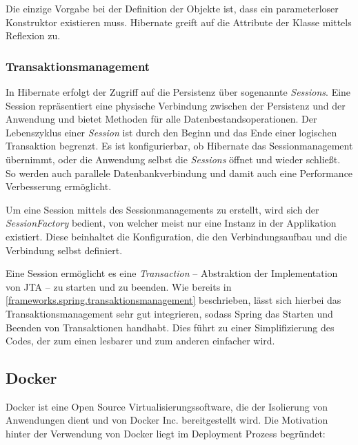 				Die einzige Vorgabe bei der Definition der Objekte ist, dass ein parameterloser Konstruktor existieren muss. Hibernate greift auf die Attribute der Klasse mittels Reflexion zu. 
				
			\subsubsection{Transaktionsmanagement} %
			
				In Hibernate erfolgt der Zugriff auf die Persistenz über sogenannte \textit{Sessions}. Eine Session repräsentiert eine physische Verbindung zwischen der Persistenz und der Anwendung und bietet Methoden für alle Datenbestandsoperationen. Der Lebenszyklus einer \textit{Session} ist durch den Beginn und das Ende einer logischen Transaktion begrenzt. Es ist konfigurierbar, ob Hibernate das Sessionmanagement übernimmt, oder die Anwendung selbst die \textit{Sessions} öffnet und wieder schließt. So werden auch parallele Datenbankverbindung und damit auch eine Performance Verbesserung ermöglicht.
				
				Um eine Session mittels des Sessionmanagements zu erstellt, wird sich der \textit{SessionFactory} bedient, von welcher meist nur eine Instanz in der Applikation existiert. Diese beinhaltet die Konfiguration, die den Verbindungsaufbau und die Verbindung selbst definiert.
				
				Eine Session ermöglicht es eine \textit{Transaction} -- Abstraktion der Implementation von \acs{JTA} -- zu starten und zu beenden. Wie bereits in \autoref{frameworks.spring.transaktionsmanagement} beschrieben, lässt sich hierbei das Transaktionsmanagement sehr gut integrieren, sodass Spring das Starten und Beenden von Transaktionen handhabt. Dies führt zu einer Simplifizierung des Codes, der zum einen lesbarer und zum anderen einfacher wird. 
				
		\subsection{Docker} %
			
			Docker ist eine Open Source Virtualisierungssoftware, die der Isolierung von Anwendungen dient und von Docker Inc. bereitgestellt wird. Die Motivation hinter der Verwendung von Docker liegt im Deployment Prozess begründet: 
			
